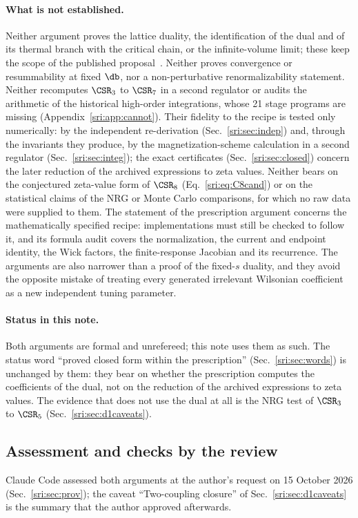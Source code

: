 \paragraph{What is not established.} Neither argument proves the lattice duality, the identification of the dual and
of its thermal branch with the critical chain, or the infinite-volume limit; these keep the scope of the published
proposal~\cite{sri:Benedetti:2024wgx,sri:Benedetti:2025nzp}. Neither proves convergence or resummability at fixed $\db$, nor
a non-perturbative renormalizability statement. Neither recomputes $\CSR_3$ to $\CSR_7$ in a second regulator or
audits the arithmetic of the historical high-order integrations, whose 21 stage programs are missing
(Appendix~\ref{sri:app:cannot}). Their fidelity to the recipe is tested only numerically: by the independent
re-derivation (Sec.~\ref{sri:sec:indep}) and, through the invariants they produce, by the magnetization-scheme calculation
in a second regulator (Sec.~\ref{sri:sec:integ}); the exact certificates (Sec.~\ref{sri:sec:closed}) concern the later reduction of the archived
expressions to zeta values. Neither bears on the conjectured zeta-value form of
$\CSR_8$ (Eq.~\eqref{sri:eq:C8cand}) or on the statistical claims of the NRG or Monte Carlo comparisons, for which no raw
data were supplied to them. The statement of the prescription argument
concerns the mathematically specified recipe: implementations must still be checked to follow it, and its formula audit
covers the normalization, the current and endpoint identity, the Wick factors, the finite-response Jacobian and its
recurrence. The arguments are also narrower than a proof of the fixed-$s$ duality, and they avoid the opposite mistake
of treating every generated irrelevant Wilsonian coefficient as a new independent tuning parameter.

\paragraph{Status in this note.} Both arguments are formal and unrefereed; this note uses them as such. The status
word ``proved closed form within the prescription'' (Sec.~\ref{sri:sec:words}) is unchanged by them: they bear on whether
the prescription computes the coefficients of the dual, not on the reduction of the archived expressions to zeta
values. The evidence that does not use the dual at all is the NRG test of $\CSR_3$ to $\CSR_5$
(Sec.~\ref{sri:sec:d1caveats}).

\subsection{Assessment and checks by the review}\label{sri:app:clos:checks}
Claude Code assessed both arguments at the author's request on 15 October 2026 (Sec.~\ref{sri:sec:prov}); the caveat
``Two-coupling closure'' of Sec.~\ref{sri:sec:d1caveats} is the summary that the author approved afterwards.

